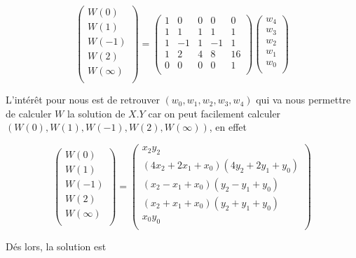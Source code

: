\documentclass[letterpaper]{article}
\begin{document}
$$
\begin{pmatrix}
  W (0) \\
  W (1) \\
  W (-1) \\
  W (2) \\
  W (\infty) \\
\end{pmatrix}
 =
\begin{pmatrix}
  1 & 0 & 0 & 0 & 0 \\
  1 & 1 & 1 & 1 & 1 \\
  1 &-1 & 1 &-1 & 1 \\
  1 & 2 & 4 & 8 &16 \\
  0 & 0 & 0 & 0 & 1 \\
\end{pmatrix}
\begin{pmatrix}
  w_4 \\
  w_3 \\
  w_2 \\
  w_1 \\
  w_0 \\
\end{pmatrix}
$$

L'intérêt pour nous est de retrouver $(w_0, w_1, w_2, w_3, w_4)$ qui va nous
permettre de calculer $W$ la solution de $X.Y$ car on peut facilement calculer
$(W(0), W(1), W(-1), W(2), W(\infty))$, en effet

$${\displaystyle
\begin{pmatrix}
  W(0) \\
  W(1) \\
  W(-1) \\
  W(2) \\
  W(\infty) \\
\end{pmatrix}
=
\begin{pmatrix}
  x_2y_2 \\
  (4x_2 + 2x_1 + x_0) (4y_2+ 2y_1 + y_0)\\
  (x_2 - x_1 + x_0) (y_2 - y_1 + y_0)\\
  (x_2 + x_1 + x_0) (y_2 + y_1 + y_0)\\
  x_0y_0\\
\end{pmatrix}
}$$

Dés lors, la solution est
\end{document}
